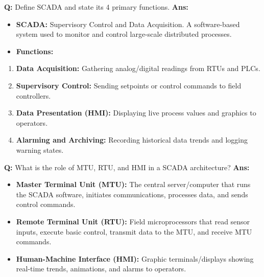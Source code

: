 \documentclass[10pt,a4paper,twocolumn]{article}
\begin{document}
\begin{tcolorbox}[
  colback=white,
  colframe=UnitColorThree,
  colbacktitle=gray!10!white,
  coltitle=black,
  fonttitle=\bfseries\sffamily\small,
  title={Unit III $\bullet$ Card 5: SCADA Definition \& Functions},
  boxrule=1.2pt,
  arc=2mm,
  outer arc=2mm,
  boxsep=1.5mm,
  top=1mm,
  bottom=1mm,
  left=1.5mm,
  right=1.5mm,
  before skip=2.5mm,
  after skip=2.5mm
]
\textbf{Q:} Define SCADA and state its 4 primary functions.
\tcbline
\textbf{Ans:} \begin{itemize}
  \item   \textbf{SCADA:} Supervisory Control and Data Acquisition. A software-based system used to monitor and control large-scale distributed processes.
  \item   \textbf{Functions:}
\end{itemize}
\begin{enumerate}
  \item \textbf{Data Acquisition:} Gathering analog/digital readings from RTUs and PLCs.
  \item \textbf{Supervisory Control:} Sending setpoints or control commands to field controllers.
  \item \textbf{Data Presentation (HMI):} Displaying live process values and graphics to operators.
  \item \textbf{Alarming and Archiving:} Recording historical data trends and logging warning states.
\end{enumerate}
\end{tcolorbox}


\begin{tcolorbox}[
  colback=white,
  colframe=UnitColorThree,
  colbacktitle=gray!10!white,
  coltitle=black,
  fonttitle=\bfseries\sffamily\small,
  title={Unit III $\bullet$ Card 6: SCADA System Components},
  boxrule=1.2pt,
  arc=2mm,
  outer arc=2mm,
  boxsep=1.5mm,
  top=1mm,
  bottom=1mm,
  left=1.5mm,
  right=1.5mm,
  before skip=2.5mm,
  after skip=2.5mm
]
\textbf{Q:} What is the role of MTU, RTU, and HMI in a SCADA architecture?
\tcbline
\textbf{Ans:} \begin{itemize}
  \item   \textbf{Master Terminal Unit (MTU):} The central server/computer that runs the SCADA software, initiates communications, processes data, and sends control commands.
  \item   \textbf{Remote Terminal Unit (RTU):} Field microprocessors that read sensor inputs, execute basic control, transmit data to the MTU, and receive MTU commands.
  \item   \textbf{Human-Machine Interface (HMI):} Graphic terminals/displays showing real-time trends, animations, and alarms to operators.
\end{itemize}
\end{tcolorbox}
\end{document}
